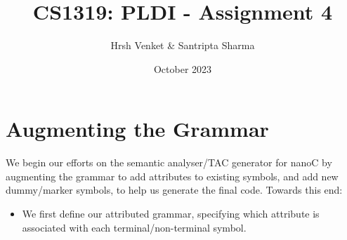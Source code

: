 \documentclass{article}
\title{CS1319: PLDI - Assignment 4}
\author{Hrsh Venket \& Santripta Sharma}
\date{October 2023}
\begin{document}
\maketitle 

\section{Augmenting the Grammar}
We begin our efforts on the semantic analyser/TAC generator for nanoC by augmenting the grammar to add attributes to existing symbols, and add new dummy/marker symbols, to help us generate the final code. Towards this end:

\begin{itemize}
	\item We first define our attributed grammar, specifying which attribute is associated with each terminal/non-terminal symbol.
\end{itemize}
\end{document}
